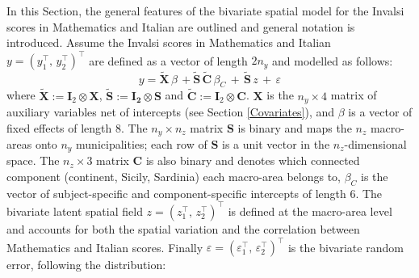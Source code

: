 \documentclass[openany, 11pt, oneside]{book}
\begin{document}
In this Section, the general features of the bivariate spatial model for the Invalsi scores in Mathematics and Italian are outlined and general notation is introduced.
Assume the Invalsi scores in Mathematics and Italian $y = (y_1^{\top}, \, y_2^{\top})^{\top}$ are defined as a vector of length $2n_y$ and modelled as follows:
\begin{equation}
y =  \boldsymbol{\tilde{X}}  \, \beta \,  + 
\tilde{\boldsymbol{S}} \, \boldsymbol{\tilde{C}} \, \beta_C \,  +
\, \tilde{\boldsymbol{S}} \,z \, + \, \varepsilon
\label{eq:model}
\end{equation}
%
%
where $\boldsymbol{\tilde{X}} := \boldsymbol{I}_2 \otimes \boldsymbol{X}$, $\tilde{\boldsymbol{S}} :=\boldsymbol{ I_2 }\otimes \boldsymbol{S}$ and $\boldsymbol{\tilde{C}} := \boldsymbol{ I}_2 \otimes \boldsymbol{C}$. $\boldsymbol{X}$ is the $n_y \times 4$ matrix of auxiliary variables net of intercepts (see Section \ref{Covariates}), and $\beta$ is a vector of fixed effects of length $8$. The $n_y \times n_z$ matrix $\boldsymbol{S}$ is binary and maps the $n_z$ macro-areas onto $n_y$ municipalities; each row of $\boldsymbol{S}$ is a unit vector in the $n_z$-dimensional space. The $n_z \times 3$ matrix $\boldsymbol{C}$ is also binary and denotes which connected component (continent, Sicily, Sardinia) each macro-area belongs to, $\beta_C$ is the vector of subject-specific and component-specific intercepts of length $6$. The bivariate latent spatial field $z = (z_1^{\top}, \, z_2^{\top})^{\top}$ is defined at the macro-area level and accounts for both the spatial variation and the correlation between Mathematics and Italian scores. Finally $\varepsilon = (\varepsilon_1^{\top} , \, \varepsilon_2^{\top})^{\top}$ is the bivariate random error, following the distribution:
\end{document}
